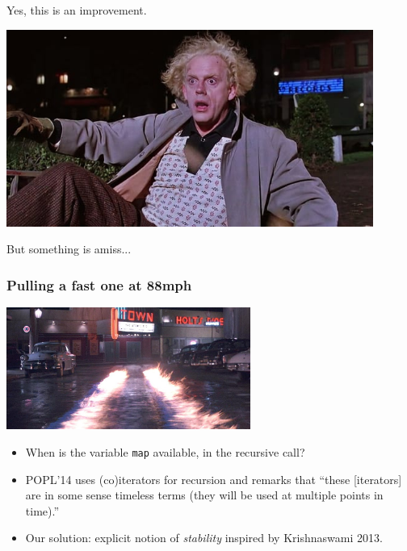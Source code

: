\documentclass{beamer}
\begin{document}
\begin{frame}
  \centering
  \alert{\Huge Yes, this is an improvement.}

  \includegraphics[width=0.9\textwidth]{doc-brown-wow.jpg}
  \pause

  But something is amiss...
\end{frame}

\begin{frame}
  \frametitle{Pulling a fast one at 88mph}

  \begin{center}
    \includegraphics[width=0.6\textwidth]{delorean-flames.png}
  \end{center}

  \pause

  \begin{itemize}[<+->]
    \item
      \alert{When} is the variable \texttt{map} available, in the recursive call?
    \item
      POPL'14 uses (co)iterators for recursion and remarks that
      ``these [iterators] are in some sense timeless terms (they will be used
      at multiple points in time).''
    \item
      Our solution: explicit notion of \emph{stability} inspired by
      Krishnaswami 2013.
  \end{itemize}
\end{frame}
\end{document}
